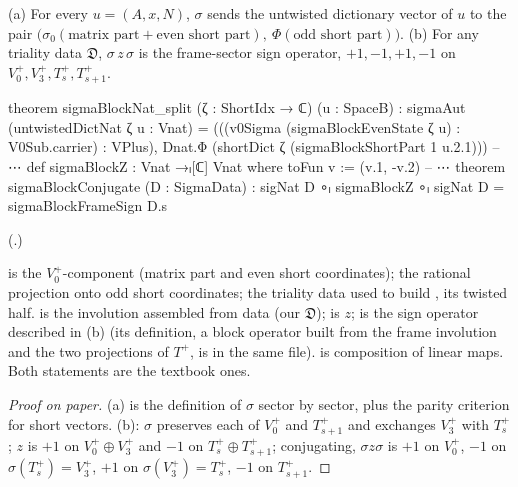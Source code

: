 \begin{theorem}\label{ch22:thm:sector}
(a) For every $u=(A,x,N)$, $\sigma$ sends the untwisted dictionary vector of $u$ to the pair
$\bigl(\sigma_0(\text{matrix part}+\text{even short part}),\ \Phi(\text{odd short part})\bigr)$.
(b) For any triality data $\mathfrak D$, $\sigma\,z\,\sigma$ is the frame-sector sign operator, $+1,-1,+1,-1$ on
$V_0^+,V_3^+,T_s^+,T_{s+1}^+$.
\end{theorem}
\begin{leancode}
theorem sigmaBlockNat_split (ζ : ShortIdx → ℂ) (u : SpaceB) :
    sigmaAut (untwistedDictNat ζ u : Vnat) =
      (((v0Sigma (sigmaBlockEvenState ζ u) : V0Sub.carrier) : VPlus),
        Dnat.Φ (shortDict ζ (sigmaBlockShortPart 1 u.2.1)))
-- ⋯
def sigmaBlockZ : Vnat →ₗ[ℂ] Vnat where
  toFun v := (v.1, -v.2)
-- ⋯
theorem sigmaBlockConjugate (D : SigmaData) :
    sigNat D ∘ₗ sigmaBlockZ ∘ₗ sigNat D = sigmaBlockFrameSign D.s
\end{leancode}
(.)
\begin{dictionary}
 is the $V_0^+$-component (matrix part and even short coordinates);
 the rational projection onto odd short coordinates;  the triality data used to
build ,  its twisted half.   is the involution assembled from data  (our $\mathfrak D$);
 is $z$;  is the sign operator described in (b) (its definition, a block
operator built from the frame involution  and the two projections of $T^+$, is in the same file).
 is composition of linear maps.  Both statements are the textbook ones.
\end{dictionary}
\begin{proof}[Proof on paper]
(a) is the definition of $\sigma$ sector by sector, plus the parity criterion for short vectors.  (b): $\sigma$ preserves
each of $V_0^+$ and $T_{s+1}^+$ and exchanges $V_3^+$ with $T_s^+$; $z$ is $+1$ on $V_0^+\oplus V_3^+$ and $-1$ on
$T_s^+\oplus T_{s+1}^+$; conjugating, $\sigma z\sigma$ is $+1$ on $V_0^+$, $-1$ on $\sigma(T_s^+)=V_3^+$, $+1$ on
$\sigma(V_3^+)=T_s^+$, $-1$ on $T_{s+1}^+$.
\end{proof}
